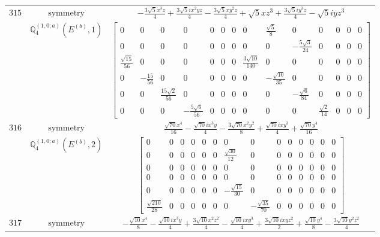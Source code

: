 \documentclass[fleqn,8pt,landscape]{jsarticle}
\begin{document}
\begin{longtable}{ccc}
$ 315 $ & $ \text{symmetry} $ & $ - \frac{3 \sqrt{5} x^{3} z}{4} + \frac{3 \sqrt{5} i x^{2} y z}{4} - \frac{3 \sqrt{5} x y^{2} z}{4} + \sqrt{5} x z^{3} + \frac{3 \sqrt{5} i y^{3} z}{4} - \sqrt{5} i y z^{3} $ \\
$  $ & $ \mathbb{Q}_{4}^{(1,0;a)}(E^{(b)},1) $ & $ \begin{bmatrix} 0 & 0 & 0 & 0 & 0 & 0 & 0 & 0 & \frac{\sqrt{5}}{8} & 0 & 0 & 0 & 0 & 0 \\ 0 & 0 & 0 & 0 & 0 & 0 & 0 & 0 & 0 & - \frac{5 \sqrt{3}}{24} & 0 & 0 & 0 & 0 \\ \frac{\sqrt{15}}{56} & 0 & 0 & 0 & 0 & 0 & 0 & \frac{3 \sqrt{10}}{140} & 0 & 0 & 0 & 0 & 0 & 0 \\ 0 & - \frac{15}{56} & 0 & 0 & 0 & 0 & 0 & 0 & - \frac{\sqrt{10}}{35} & 0 & 0 & 0 & 0 & 0 \\ 0 & 0 & \frac{15 \sqrt{2}}{56} & 0 & 0 & 0 & 0 & 0 & 0 & - \frac{\sqrt{6}}{84} & 0 & 0 & 0 & 0 \\ 0 & 0 & 0 & - \frac{5 \sqrt{6}}{56} & 0 & 0 & 0 & 0 & 0 & 0 & \frac{\sqrt{2}}{14} & 0 & 0 & 0 \end{bmatrix} $ \\ \hline
$ 316 $ & $ \text{symmetry} $ & $ \frac{\sqrt{70} x^{4}}{16} - \frac{\sqrt{70} i x^{3} y}{4} - \frac{3 \sqrt{70} x^{2} y^{2}}{8} + \frac{\sqrt{70} i x y^{3}}{4} + \frac{\sqrt{70} y^{4}}{16} $ \\
$  $ & $ \mathbb{Q}_{4}^{(1,0;a)}(E^{(b)},2) $ & $ \begin{bmatrix} 0 & 0 & 0 & 0 & 0 & 0 & 0 & 0 & 0 & 0 & 0 & 0 & 0 & 0 \\ 0 & 0 & 0 & 0 & 0 & 0 & \frac{\sqrt{30}}{12} & 0 & 0 & 0 & 0 & 0 & 0 & 0 \\ 0 & 0 & 0 & 0 & 0 & 0 & 0 & 0 & 0 & 0 & 0 & 0 & 0 & 0 \\ 0 & 0 & 0 & 0 & 0 & 0 & 0 & 0 & 0 & 0 & 0 & 0 & 0 & 0 \\ 0 & 0 & 0 & 0 & 0 & 0 & - \frac{\sqrt{15}}{30} & 0 & 0 & 0 & 0 & 0 & 0 & 0 \\ \frac{\sqrt{210}}{28} & 0 & 0 & 0 & 0 & 0 & 0 & - \frac{\sqrt{35}}{70} & 0 & 0 & 0 & 0 & 0 & 0 \end{bmatrix} $ \\ \hline
$ 317 $ & $ \text{symmetry} $ & $ - \frac{\sqrt{10} x^{4}}{8} - \frac{\sqrt{10} i x^{3} y}{4} + \frac{3 \sqrt{10} x^{2} z^{2}}{4} - \frac{\sqrt{10} i x y^{3}}{4} + \frac{3 \sqrt{10} i x y z^{2}}{2} + \frac{\sqrt{10} y^{4}}{8} - \frac{3 \sqrt{10} y^{2} z^{2}}{4} $ \\

\end{longtable}
\end{document}
